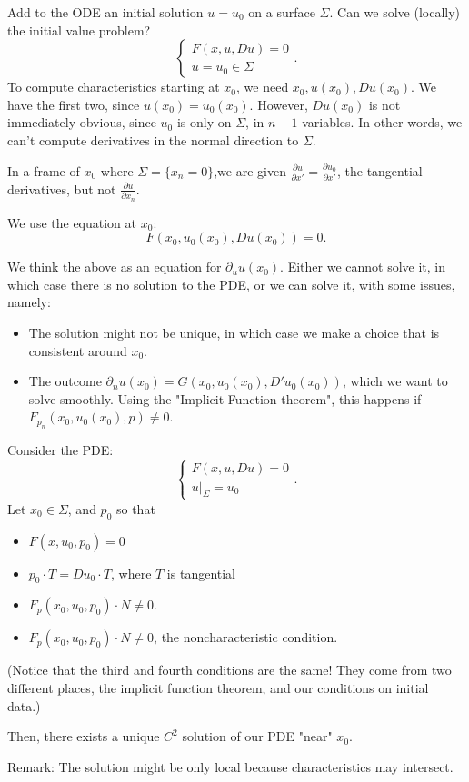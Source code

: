 \documentclass[12pt]{scrartcl}
\begin{document}
Add to the ODE an initial solution $u = u_0$ on a surface $\Sigma$.  Can we solve (locally) the initial value problem?
$$\begin{cases}
F(x, u, Du) = 0 \\
u = u_0 \in \Sigma
\end{cases}.$$
To compute characteristics starting at $x_0$, we need $x_0, u(x_0), Du(x_0)$.  We have the first two, since $u(x_0) = u_0(x_0)$.  However, $Du(x_0)$ is not immediately obvious, since $u_0$ is only on $\Sigma$, in $n-1$ variables.  In other words, we can't compute derivatives in the normal direction to $\Sigma$.  

In a frame of $x_0$ where $\Sigma = \{x_n = 0\}$,we are given $\frac{\partial u}{\partial x'} =\frac{\partial u_0}{\partial x'}$, the tangential derivatives, but not $\frac{\partial u}{\partial x_n}$.

We use the equation at $x_0$: 
$$F(x_0, u_0(x_0), Du(x_0)) = 0.  $$

We think the above as an equation for $\partial_u u(x_0)$.  Either we cannot solve it, in which case there is no solution to the PDE, or we can solve it, with some issues, namely:
\begin{itemize}
\item The solution might not be unique, in which case we make a choice that is consistent around $x_0$.
\item The outcome $\partial_n u(x_0) = G(x_0, u_0(x_0), D'u_0(x_0))$, which we want to solve smoothly. Using the "Implicit Function theorem", this happens if $\boxed{F_{p_n}(x_0, u_0(x_0), p) \ne 0}$.
\end{itemize}
\begin{thm} Consider the PDE:
$$\begin{cases}
F(x, u, Du) = 0 \\
u \vert_{\Sigma} = u_0
\end{cases}.$$
Let $x_0 \in \Sigma$, and $p_0$ so that 
\begin{itemize}
\item $F(x, u_0, p_0) = 0$
\item $p_0 \cdot T = Du_0 \cdot T$, where  $T$ is tangential
\item $F_p(x_0, u_0, p_0) \cdot N \ne 0$.
\item $F_p(x_0, u_0, p_0) \cdot N \ne 0$, the noncharacteristic condition.
\end{itemize}
(Notice that the third and fourth conditions are the same!  They come from two different places, the implicit function theorem, and our conditions on initial data.)

Then, there exists a unique $C^2$ solution of our PDE "near" $x_0$.
\end{thm}
Remark:  The solution might be only local because characteristics may intersect.
\end{document}
